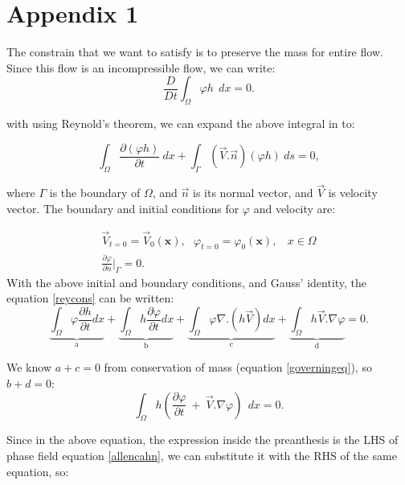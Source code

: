 \documentclass[letterpaper,10pt]{article}
\begin{document}
\newpage
\appendix
\section{Appendix 1} \label{app1}

The constrain that we want to satisfy is to preserve the mass for entire flow. Since this flow is an incompressible flow, we can write:
\begin{equation} 
\frac{D}{Dt} \int_\Omega \varphi h \ \ dx= 0.
\end{equation}

with using Reynold's theorem, we can expand the above integral in to:

\begin{equation} \label{reycons}
\int_\Omega \frac{\partial (\varphi h)}{\partial t} \ dx + \int_\Gamma (\overrightarrow{V}.\overrightarrow{n}) (\varphi h)\  ds = 0,
\end{equation}

where $ \Gamma $ is the boundary of $\Omega$, and $\overrightarrow{n}$ is its normal vector, and $\overrightarrow{V}$ is velocity vector. The boundary and initial conditions for $\varphi$ and velocity are:

\begin{gather*} 
\overrightarrow{V}_{t=0}=\overrightarrow{V}_0(\textbf{x}), \ \ \ 
\varphi_{t=0}=\varphi_0(\textbf{x}), \ \ \ \ x\in \Omega \\
\frac{\partial \varphi}{\partial n}\vert_{\Gamma} = 0.
\end{gather*}
With the above initial and boundary conditions, and Gauss' identity, the equation \eqref{reycons} can be written:
\begin{equation}
\label{expand}
\underbrace{\int_\Omega \varphi \frac{\partial h}{\partial t} dx}_\text{a} + 
\underbrace{\int_\Omega h \frac{\partial \varphi}{\partial t} dx}_\text{b} +
\underbrace{\int_\Omega \varphi \nabla.(h\overrightarrow{V}) dx}_\text{c} +
\underbrace{\int_\Omega h\overrightarrow{V}.\nabla \varphi }_\text{d}
= 0.
\end{equation}

We know $a+c=0$ from conservation of mass (equation \eqref{governingeq}), so   $b+d=0$:
\begin{equation}
\label{expand1}
 \int_\Omega h (\frac{\partial \varphi}{\partial t} \  + \
\overrightarrow{V}.\nabla \varphi) \ \ dx = 0.
\end{equation}

Since in the above equation, the expression inside the preanthesis is the LHS of phase field equation \eqref{allencahn}, we can substitute it with the RHS of the same equation, so:
\end{document}
